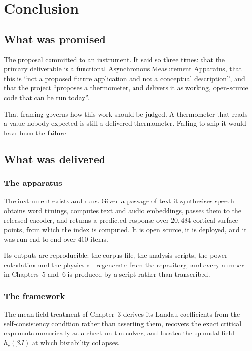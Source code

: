 \chapter{Conclusion}
\label{ch:conclusion}

\section{What was promised}

The proposal committed to an instrument. It said so three times: that the primary deliverable
is a functional Asynchronous Measurement Apparatus, that this is ``not a proposed future
application and not a conceptual description'', and that the project ``proposes a thermometer,
and delivers it as working, open-source code that can be run today''.

That framing governs how this work should be judged. A thermometer that reads a value nobody
expected is still a delivered thermometer. Failing to ship it would have been the failure.

\section{What was delivered}

\subsection{The apparatus}

The instrument exists and runs. Given a passage of text it synthesises speech, obtains word
timings, computes text and audio embeddings, passes them to the released encoder, and returns
a predicted response over $20{,}484$ cortical surface points, from which the index is
computed. It is open source, it is deployed, and it was run end to end over 400 items.

Its outputs are reproducible: the corpus file, the analysis scripts, the power calculation
and the physics all regenerate from the repository, and every number in Chapters~5 and~6 is
produced by a script rather than transcribed.

\subsection{The framework}

The mean-field treatment of Chapter~3 derives its Landau coefficients from the
self-consistency condition rather than asserting them, recovers the exact critical exponents
numerically as a check on the solver, and locates the spinodal field $h_c(\beta J)$ at which
bistability collapses.

